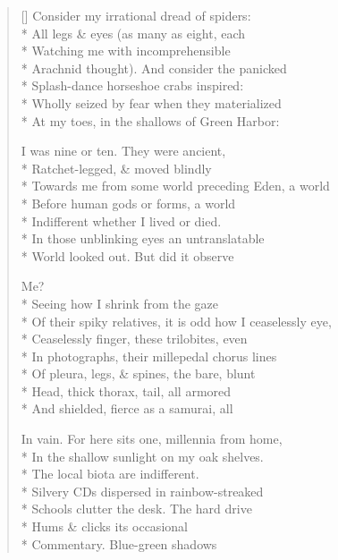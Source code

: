 \label{ch:fossil_life}
\settowidth{\versewidth}{Of their spiky relatives, it is odd how I ceaselessly eye,}
\begin{verse}[\versewidth]
Consider my irrational dread of spiders:\\*
All legs \& eyes (as many as eight, each\\*
Watching me with incomprehensible \\*
Arachnid thought). And consider the panicked \\*
Splash-dance horseshoe crabs inspired:\\*
Wholly seized by fear when they materialized\\*
At my toes, in the shallows of Green Harbor:

I was nine or ten. They were ancient, \\*
Ratchet-legged, \& moved blindly\\*
Towards me from some world preceding Eden, a world\\*
Before human gods or forms, a world\\*
Indifferent whether I lived or died.\\*
In those unblinking eyes an untranslatable\\*
World looked out.  But did it observe

Me?\\*
 \qquad Seeing how I shrink from the gaze\\*
Of their spiky relatives, it is odd how I ceaselessly eye,\\*
Ceaselessly finger, these trilobites, even\\*
In photographs, their millepedal chorus lines\\*
Of pleura, legs, \& spines, the bare, blunt\\*
Head, thick thorax, tail, all armored\\*
And shielded, fierce as a samurai, all

In vain.  For here sits one, millennia from home,\\*
In the shallow sunlight on my oak shelves.\\*
The local biota are indifferent.\\*
Silvery CDs dispersed in rainbow-streaked\\*
Schools clutter the desk.  The hard drive\\*
Hums \& clicks its occasional\\*
Commentary. Blue-green shadows






\end{verse}
